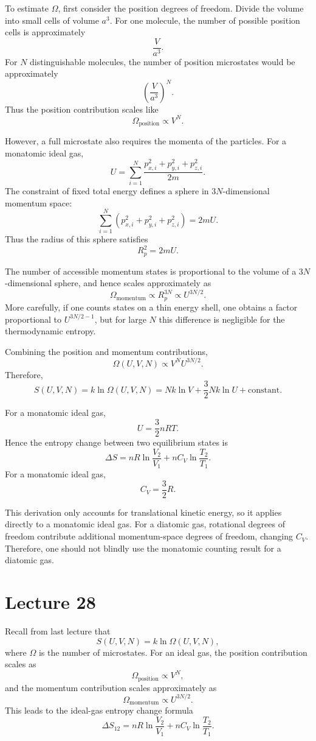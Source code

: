 \documentclass{report}
\numberwithin{equation}{section}
\begin{document}
To estimate \(\Omega\), first consider the position degrees of freedom. Divide the volume into small cells of volume \(a^3\). For one molecule, the number of possible position cells is approximately
\[
\frac{V}{a^3}.
\]
For \(N\) distinguishable molecules, the number of position microstates would be approximately
\[
\left(\frac{V}{a^3}\right)^N.
\]
Thus the position contribution scales like
\[
\Omega_{\text{position}}\propto V^N.
\]

However, a full microstate also requires the momenta of the particles. For a monatomic ideal gas,
\[
U=\sum_{i=1}^N \frac{p_{x,i}^2+p_{y,i}^2+p_{z,i}^2}{2m}.
\]
The constraint of fixed total energy defines a sphere in \(3N\)-dimensional momentum space:
\[
\sum_{i=1}^N \left(p_{x,i}^2+p_{y,i}^2+p_{z,i}^2\right)=2mU.
\]
Thus the radius of this sphere satisfies
\[
R_p^2=2mU.
\]

The number of accessible momentum states is proportional to the volume of a \(3N\)-dimensional sphere, and hence scales approximately as
\[
\Omega_{\text{momentum}}\propto R_p^{3N}\propto U^{3N/2}.
\]
More carefully, if one counts states on a thin energy shell, one obtains a factor proportional to \(U^{3N/2-1}\), but for large \(N\) this difference is negligible for the thermodynamic entropy.

Combining the position and momentum contributions,
\[
\Omega(U,V,N)\propto V^N U^{3N/2}.
\]
Therefore,
\[
S(U,V,N)
=
k\ln \Omega(U,V,N)
=
Nk\ln V+\frac{3}{2}Nk\ln U+\text{constant}.
\]

For a monatomic ideal gas,
\[
U=\frac{3}{2}nRT.
\]
Hence the entropy change between two equilibrium states is
\[
\Delta S
=
nR\ln\frac{V_2}{V_1}
+
nC_V\ln\frac{T_2}{T_1}.
\]
For a monatomic ideal gas,
\[
C_V=\frac{3}{2}R.
\]

This derivation only accounts for translational kinetic energy, so it applies directly to a monatomic ideal gas. For a diatomic gas, rotational degrees of freedom contribute additional momentum-space degrees of freedom, changing \(C_V\). Therefore, one should not blindly use the monatomic counting result for a diatomic gas.

\section{Lecture 28}

Recall from last lecture that
\[
S(U,V,N)=k\ln\Omega(U,V,N),
\]
where \(\Omega\) is the number of microstates. For an ideal gas, the position contribution scales as
\[
\Omega_{\text{position}}\propto V^N,
\]
and the momentum contribution scales approximately as
\[
\Omega_{\text{momentum}}\propto U^{3N/2}.
\]
This leads to the ideal-gas entropy change formula
\[
\Delta S_{12}
=
nR\ln\frac{V_2}{V_1}
+
nC_V\ln\frac{T_2}{T_1}.
\]
\end{document}
